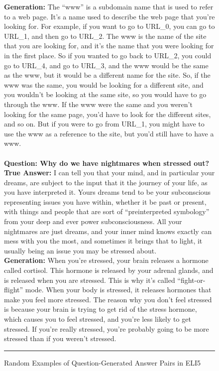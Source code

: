 \documentclass[11pt,a4paper]{article}
\begin{document}
\begin{figure*}[t]
    \textbf{Generation:} The ``www'' is a subdomain name that is used to refer to a web page. It's a name used to describe the web page that you're looking for. For example, if you want to go to URL\_0, you can go to URL\_1, and then go to URL\_2. The www is the name of the site that you are looking for, and it's the name that you were looking for in the first place. So if you wanted to go back to URL\_2, you could go to URL\_4, and go to URL\_3, and the www would be the same as the www, but it would be a different name for the site. So, if the www was the same, you would be looking for a different site, and you wouldn't be looking at the same site, so you would have to go through the www. If the www were the same and you weren't looking for the same page, you'd have to look for the different sites, and so on. But if you were to go from URL\_1, you might have to use the www as a reference to the site, but you'd still have to have a www.\\ 
    \\
    
    \vspace{2mm} \textbf{Question: Why do we have nightmares when stressed out?}\\
    
    \textbf{True Answer:} I can tell you that your mind, and in particular your dreams, are subject to the input that it the journey of your life, as you have interpreted it. Yours dreams tend to be your subconscious representing issues you have within, whether it be past or present, with things and people that are sort of ``preinterpreted symbology'' from your deep and ever power subconsciousness. All your nightmares are just dreams, and your inner mind knows exactly can mess with you the most, and sometimes it brings that to light, it usually being an issue you may be stressed about.\\
    
    \textbf{Generation:} When you're stressed, your brain releases a hormone called cortisol. This hormone is released by your adrenal glands, and is released when you are stressed. This is why it's called ``fight-or-flight'' mode. When your body is stressed, it releases hormones that make you feel more stressed. The reason why you don't feel stressed is because your brain is trying to get rid of the stress hormone, which causes you to feel stressed, and you're less likely to get stressed. If you're really stressed, you're probably going to be more stressed than if you weren't stressed.\\
  \rule{\linewidth}{1pt}
  \caption{Random Examples of Question-Generated Answer Pairs in ELI5}
  \label{fig:examples_eli5}
\end{figure*} 
\end{document}
